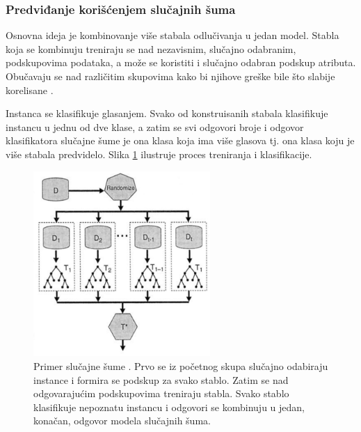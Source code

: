 \subsubsection{Predviđanje korišćenjem slučajnih šuma} 


Osnovna ideja je kombinovanje više stabala odlučivanja u jedan model. Stabla koja se kombinuju treniraju se nad nezavisnim, slučajno odabranim, podskupovima podataka, a može se koristiti i slučajno odabran podskup atributa. Obučavaju se nad različitim skupovima kako bi njihove greške bile što slabije korelisane \cite{ml}.  
 
Instanca se klasifikuje glasanjem. Svako od konstruisanih stabala klasifikuje instancu u jednu od dve klase, a zatim se svi odgovori broje i odgovor klasifikatora slučajne šume je ona klasa koja ima više glasova tj. ona klasa koju je više stabala predvidelo. Slika \ref{fig:rf} ilustruje proces treniranja i klasifikacije.


\begin{figure}[H]
	\centering
	\includegraphics[width=0.6\textwidth]{Figures/random_forests.png}
	\caption{Primer slučajne šume \cite{introDM}. Prvo se iz početnog skupa slučajno odabiraju instance i formira se podskup za svako stablo. Zatim se nad odgovarajućim podskupovima treniraju stabla. Svako stablo klasifikuje nepoznatu instancu i odgovori se kombinuju u jedan, konačan, odgovor modela slučajnih šuma.}
	\label{fig:rf}
\end{figure}